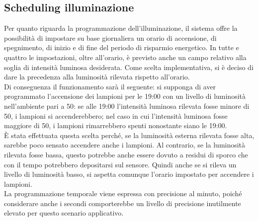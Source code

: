 \subsection{Scheduling illuminazione \label{si}}
Per quanto riguarda la programmazione dell'illuminazione, il sistema offre la possibilità di impostare su base giornaliera un orario di accensione, di spegnimento, di inizio e di fine del periodo di risparmio energetico.
In tutte e quattro le impostazioni, oltre all'orario, è previsto anche un campo relativo alla soglia di intensità luminosa desiderata.
Come scelta implementativa, si è deciso di dare la precedenza alla luminosità rilevata rispetto all'orario.
\\Di conseguenza il funzionamento sarà il seguente: si supponga di aver programmato l'accensione dei lampioni per le 19:00 con un livello di luminosità nell'ambiente pari a 50:
se alle 19:00 l'intensità luminosa rilevata fosse minore di 50, i lampioni si accenderebbero; nel caso in cui l'intensità luminosa fosse maggiore di 50, i lampioni rimarrebbero spenti nonostante siano le 19:00.
\\È stata effettuata questa scelta perché, se la luminosità esterna rilevata fosse alta, sarebbe poco sensato accendere anche i lampioni.
Al contrario, se la luminosità rilevata fosse bassa, questo potrebbe anche essere dovuto a residui di sporco che con il tempo potrebbero depositarsi sul sensore.
Quindi anche se si rileva un livello di luminosità basso, si aspetta comunque l'orario impostato per accendere i lampioni.
\\La programmazione temporale viene espressa con precisione al minuto, poiché considerare anche i secondi comporterebbe un livello di precisione inutilmente elevato per questo scenario applicativo.
